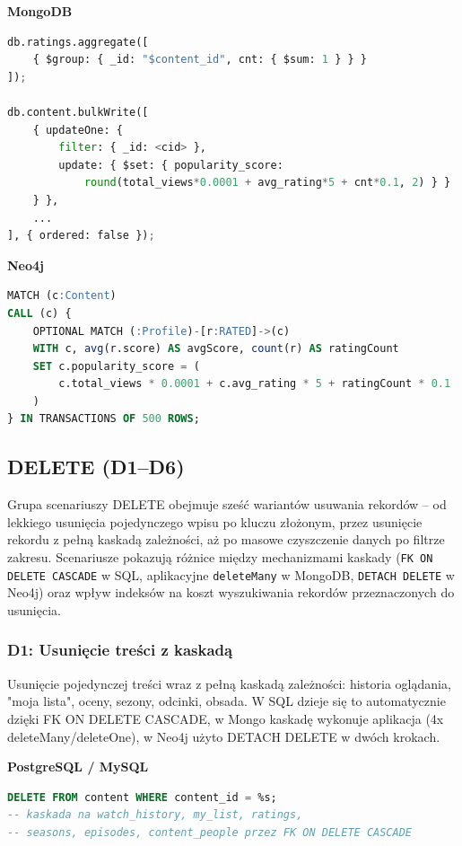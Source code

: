 \textbf{MongoDB}
\begin{lstlisting}[language=Python]
db.ratings.aggregate([
    { $group: { _id: "$content_id", cnt: { $sum: 1 } } }
]);

db.content.bulkWrite([
    { updateOne: {
        filter: { _id: <cid> },
        update: { $set: { popularity_score:
            round(total_views*0.0001 + avg_rating*5 + cnt*0.1, 2) } }
    } },
    ...
], { ordered: false });
\end{lstlisting}

\textbf{Neo4j}
\begin{lstlisting}[language=SQL]
MATCH (c:Content)
CALL (c) {
    OPTIONAL MATCH (:Profile)-[r:RATED]->(c)
    WITH c, avg(r.score) AS avgScore, count(r) AS ratingCount
    SET c.popularity_score = (
        c.total_views * 0.0001 + c.avg_rating * 5 + ratingCount * 0.1
    )
} IN TRANSACTIONS OF 500 ROWS;
\end{lstlisting}


\subsection{DELETE (D1--D6)}

Grupa scenariuszy DELETE obejmuje sześć wariantów usuwania rekordów -- od lekkiego
usunięcia pojedynczego wpisu po kluczu złożonym, przez
usunięcie rekordu z pełną kaskadą zależności, aż po masowe czyszczenie danych po
 filtrze zakresu. Scenariusze pokazują różnice między mechanizmami kaskady
(\texttt{FK ON DELETE CASCADE} w SQL, aplikacyjne \texttt{deleteMany} w MongoDB,
\texttt{DETACH DELETE} w Neo4j) oraz wpływ indeksów na koszt wyszukiwania rekordów
przeznaczonych do usunięcia.

\subsubsection{D1: Usunięcie treści z kaskadą}

Usunięcie pojedynczej treści wraz z pełną kaskadą zależności: historia
oglądania, "moja lista", oceny, sezony, odcinki, obsada. W SQL dzieje się to
automatycznie dzięki FK ON DELETE CASCADE, w Mongo kaskadę wykonuje aplikacja
(4x deleteMany/deleteOne), w Neo4j użyto DETACH DELETE w dwóch krokach.

\textbf{PostgreSQL / MySQL}
\begin{lstlisting}[language=SQL]
DELETE FROM content WHERE content_id = %s;
-- kaskada na watch_history, my_list, ratings,
-- seasons, episodes, content_people przez FK ON DELETE CASCADE
\end{lstlisting}

